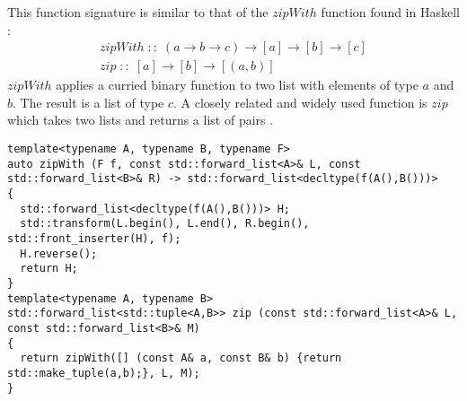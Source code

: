 \documentclass[12pt,fleqn]{article}
\begin{document}
This function signature is similar to that of the $zipWith$ function found in Haskell \cite{lipovaca, hutton}:
\begin{eqnarray*}
zipWith \;::\; (a \rightarrow b \rightarrow c ) \rightarrow [a] \rightarrow [b] \rightarrow [c] \\
zip \;::\;  [a] \rightarrow [b] \rightarrow [(a,b)]
\end{eqnarray*}
$zipWith$ applies a curried binary function to two list with elements of type $a$ and $b$.
The result is a list of type $c$.
A closely related and widely used function is $zip$ which takes two lists and returns a list of pairs \cite{zip}.
%
\begin{lstlisting}[caption=zipWith and zip implemented with std::transform, label=zipWith]
template<typename A, typename B, typename F>
auto zipWith (F f, const std::forward_list<A>& L, const std::forward_list<B>& R) -> std::forward_list<decltype(f(A(),B()))>
{
  std::forward_list<decltype(f(A(),B()))> H;
  std::transform(L.begin(), L.end(), R.begin(), std::front_inserter(H), f);
  H.reverse();
  return H;
}
template<typename A, typename B>
std::forward_list<std::tuple<A,B>> zip (const std::forward_list<A>& L, const std::forward_list<B>& M) 
{
  return zipWith([] (const A& a, const B& b) {return std::make_tuple(a,b);}, L, M);
}

\end{lstlisting}
\end{document}
